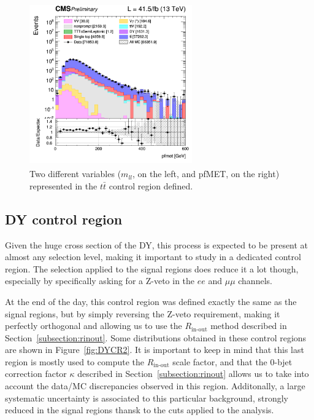 \documentclass[a4paper, 10pt, openright]{report}
\begin{document}
\begin{figure}[htbp]
{\begin{minipage}[b]{.48\textwidth}
\includegraphics[width=7cm, height=7cm]{figs/2017/log_cratio_ttbarCR_ll_METcorrected_pt.png}
\end{minipage} \hfill
}
\caption{Two different variables ($m_{ll}$, on the left, and pf\ac{MET}, on the right) represented in the $t \bar t$ control region defined.}
\label{fig:TopCR}
\end{figure}

\subsection{\acs{DY} control region} \label{section:DYCR}

Given the huge cross section of the \ac{DY}, this process is expected to be present at almost any selection level, making it important to study in a dedicated control region. The selection applied to the signal regions does reduce it a lot though, especially by specifically asking for a Z-veto in the $ee$ and $\mu \mu$ channels. 

At the end of the day, this control region was defined exactly the same as the signal regions, but by simply reversing the Z-veto requirement, making it perfectly orthogonal and allowing us to use the $R_{\text{in-out}}$ method described in Section~\ref{subsection:rinout}. Some distributions obtained in these control regions are shown in Figure~\ref{fig:DYCR2}. It is important to keep in mind that this last region is mostly used to compute the $R_{\text{in-out}}$ scale factor, and that the 0-bjet correction factor $\kappa$ described in Section~\ref{subsection:rinout} allows us to take into account the data/MC discrepancies observed in this region. Additonally, a large systematic uncertainty is associated to this particular background, strongly reduced in the signal regions thansk to the cuts applied to the analysis.
\end{document}
